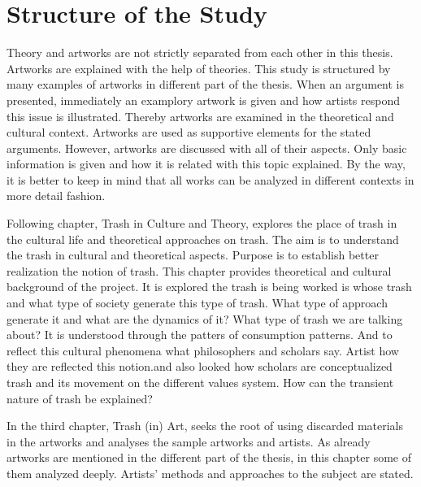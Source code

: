 


\section{Structure of the Study}
Theory and artworks are not strictly separated from each other in this thesis. Artworks are explained with the help of theories. This study is structured by many examples of artworks in different part of the thesis. When an argument is presented, immediately an examplory artwork is given and how artists respond this issue is illustrated. Thereby artworks are examined in the theoretical and cultural context. Artworks are used as supportive elements for the stated arguments. However, artworks are discussed with all of their aspects. Only basic information is given and how it is related with this topic explained. By the way, it is better to keep in mind that all works can be analyzed in different contexts in more detail fashion.

Following chapter, Trash in Culture and Theory, explores the place of trash in the cultural life and theoretical approaches on trash. The aim is to understand the trash in cultural and theoretical aspects. Purpose is to establish better realization the notion of trash. This chapter provides theoretical and cultural background of the project. It is explored the trash is being worked is whose trash and what type of society generate this type of trash. What type of approach generate it and what are the dynamics of it? What type of trash we are talking about? It is understood through the patters of consumption patterns. And to reflect this cultural phenomena what philosophers and scholars say. Artist how they are reflected this notion.and also looked how scholars are conceptualized trash and its movement on the different values system. How can the transient nature of trash be explained?

In the third chapter, Trash (in) Art, seeks the root of using discarded materials in the artworks and analyses the sample artworks and artists. As already artworks are mentioned in the different part of the thesis, in this chapter some of them analyzed deeply. Artists' methods and approaches to the subject are stated.

